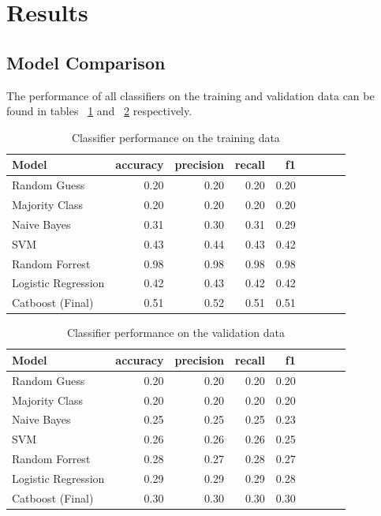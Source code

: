 \documentclass{article}
\begin{document}
	\section{Results}
	
	\subsection{Model Comparison}

	The performance of all classifiers on the training and validation data can be found in tables ~\ref{table:results_train} and ~\ref{table:results_valid} respectively.

	\begin{table}[h!]
		\centering
		\caption{Classifier performance on the training data}
		\label{table:results_train}
		
		\begin{tabular}{lrrrrrrrr}
			\toprule
			Model &     accuracy &     precision &     recall &    f1 \\
			\midrule
			Random Guess   &  0.20 &  0.20 &   0.20 &  0.20 \\
			Majority Class &    0.20 &  0.20 &   0.20 &   0.20 \\
			Naive Bayes       &   0.31 & 0.30 &  0.31 &  0.29 \\
			SVM      &  0.43 & 0.44 & 0.43 &  0.42 \\
			Random Forrest      &  0.98 & 0.98 & 0.98 &  0.98 \\
			Logistic Regression   &  0.42 & 0.43 & 0.42 &  0.42 \\
			Catboost (Final)   &  0.51 & 0.52 &  0.51 & 0.51 \\
			\bottomrule
		\end{tabular}
		
	\end{table}%

	\begin{table}[h!]
		\centering
		\caption{Classifier performance on the validation data}
		\label{table:results_valid}
		
		\begin{tabular}{lrrrrrrrr}
			\toprule
			Model &     accuracy &     precision &     recall &    f1 \\
			\midrule
			Random Guess   &  0.20 &  0.20 &   0.20 &  0.20 \\
			Majority Class &    0.20 &  0.20 &   0.20 &   0.20 \\
			Naive Bayes       &   0.25 & 0.25 &  0.25 &  0.23 \\
			SVM      &  0.26 & 0.26 & 0.26 & 0.25 \\
			Random Forrest      &  0.28 & 0.27 & 0.28 & 0.27 \\
			Logistic Regression   &  0.29 & 0.29 &  0.29 &  0.28 \\
			Catboost (Final)   &  0.30 & 0.30 &  0.30 & 0.30 \\
			\bottomrule
		\end{tabular}
		
	\end{table}%
\end{document}
